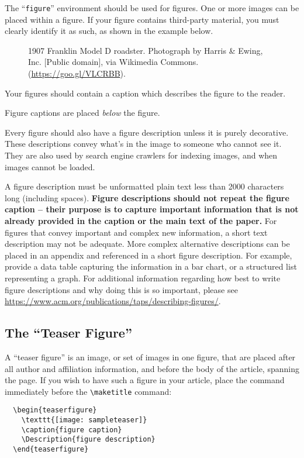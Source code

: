 \documentclass[sigconf,authordraft]{acmart}
\begin{document}
The ``\verb|figure|'' environment should be used for figures. One or
more images can be placed within a figure. If your figure contains
third-party material, you must clearly identify it as such, as shown
in the example below.
\begin{figure}[h]
  \centering
  \caption{1907 Franklin Model D roadster. Photograph by Harris \&
    Ewing, Inc. [Public domain], via Wikimedia
    Commons. (\url{https://goo.gl/VLCRBB}).}
\end{figure}

Your figures should contain a caption which describes the figure to
the reader.

Figure captions are placed {\itshape below} the figure.

Every figure should also have a figure description unless it is purely
decorative. These descriptions convey what’s in the image to someone
who cannot see it. They are also used by search engine crawlers for
indexing images, and when images cannot be loaded.

A figure description must be unformatted plain text less than 2000
characters long (including spaces).  {\bfseries Figure descriptions
  should not repeat the figure caption – their purpose is to capture
  important information that is not already provided in the caption or
  the main text of the paper.} For figures that convey important and
complex new information, a short text description may not be
adequate. More complex alternative descriptions can be placed in an
appendix and referenced in a short figure description. For example,
provide a data table capturing the information in a bar chart, or a
structured list representing a graph.  For additional information
regarding how best to write figure descriptions and why doing this is
so important, please see
\url{https://www.acm.org/publications/taps/describing-figures/}.

\subsection{The ``Teaser Figure''}

A ``teaser figure'' is an image, or set of images in one figure, that
are placed after all author and affiliation information, and before
the body of the article, spanning the page. If you wish to have such a
figure in your article, place the command immediately before the
\verb|\maketitle| command:
\begin{verbatim}
  \begin{teaserfigure}
    \texttt{[image: sampleteaser]}
    \caption{figure caption}
    \Description{figure description}
  \end{teaserfigure}
\end{verbatim}
\end{document}
